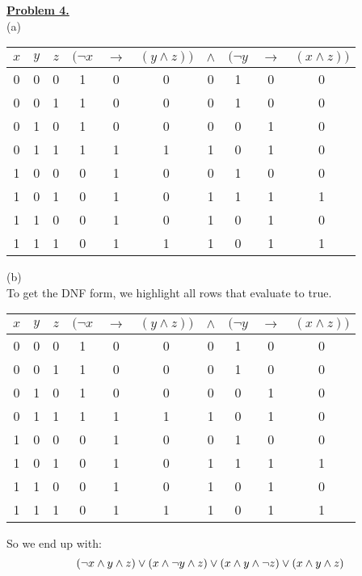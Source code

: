 \documentclass[12pt]{article}
\begin{document}
{\LARGE \noindent \underline{\textbf{Problem 4.}}}\\

(a) 
\begin{center}
    \begin{tabular}{|c|c|c|| ccc>{\columncolor[gray]{0.8}}cccc|}
        \hline
        $x$ & $y$ & $z$ &$\big(\neg x$&$\to$&$ (y \wedge z) \big)$&$ \wedge $&$\big(\neg y$&$ \to $&$ (x \wedge z)\big)$\\ 
        \hline \hline 
        0&0&0&  1&0&0&0&1&0&0 \\   
        0&0&1&  1&0&0&0&1&0&0 \\
        0&1&0&  1&0&0&0&0&1&0 \\  
        0&1&1&  1&1&1&1&0&1&0 \\ 
        \hline 
        1&0&0&  0&1&0&0&1&0&0 \\  
        1&0&1&  0&1&0&1&1&1&1 \\  
        1&1&0&  0&1&0&1&0&1&0 \\  
        1&1&1&  0&1&1&1&0&1&1 \\  
        \hline 
    \end{tabular}
\end{center}

\newpage
(b)\\
To get the DNF form, we highlight all rows that evaluate to true.
\begin{center} \begin{tabular}{|c|c|c|| ccccccc|}
    \hline
    $x$ & $y$ & $z$ &$\big(\neg x$&$\to$&$ (y \wedge z) \big)$&$ \wedge $&$\big(\neg y$&$ \to $&$ (x \wedge z)\big)$\\ 
    \hline \hline 
    0&0&0&  1&0&0&0&1&0&0 \\   
    0&0&1&  1&0&0&0&1&0&0 \\
    0&1&0&  1&0&0&0&0&1&0 \\  
    \rowcolor{epicPurple}0&1&1&  1&1&1&1&0&1&0 \\ 
    \hline 
    1&0&0&  0&1&0&0&1&0&0 \\  
    \rowcolor{epicPurple}1&0&1&  0&1&0&1&1&1&1 \\  
    \rowcolor{epicPurple}1&1&0&  0&1&0&1&0&1&0 \\  
    \rowcolor{epicPurple}1&1&1&  0&1&1&1&0&1&1 \\  
    \hline 
\end{tabular} \end{center}
So we end up with:
\[(\neg x \wedge y \wedge z)\vee (x \wedge \neg y \wedge z)\vee  (x \wedge y \wedge \neg z)\vee  (x \wedge y \wedge z)\\
\]
\end{document}
